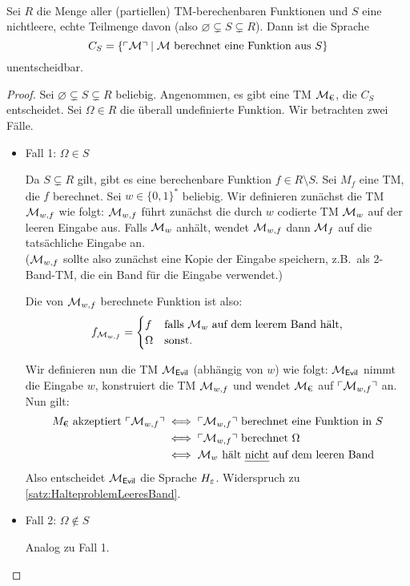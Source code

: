 \begin{Satz}\ \\
  Sei $R$ die Menge aller (partiellen) \ac{TM}-berechenbaren Funktionen und $S$
  eine nichtleere, echte Teilmenge davon (also $\varnothing \subsetneq S \subsetneq R$).
  Dann ist die Sprache
  $$C_S=\{\ulcorner \mathcal{M} \urcorner \mid \mathcal{M} \text{ berechnet eine Funktion aus }S\}$$
  unentscheidbar.
\end{Satz}
\begin{proof}
  Sei $\varnothing \subsetneq S \subsetneq R$ beliebig.
  Angenommen, es gibt eine \ac{TM} $\mathcal{M}_\text{€}$, die $C_S$ entscheidet.
  Sei $\Omega \in R$ die überall undefinierte Funktion. 
  Wir betrachten zwei Fälle.
  \begin{itemize}
   \item Fall 1: $\Omega \in S$
   
     Da $S\subsetneq R$ gilt, gibt es eine berechenbare Funktion $f \in R \setminus S$.
     Sei $M_f$ eine \ac{TM}, die $f$ berechnet.
     Sei $w\in\{0,1\}^*$ beliebig.
     Wir definieren zunächst die \ac{TM} $\mathcal{M}_{w, f}$ wie folgt:
     $\mathcal{M}_{w, f}$ führt zunächst die durch $w$ codierte \ac{TM} $\mathcal{M}_w$ auf der leeren Eingabe aus.
     Falls $\mathcal{M}_w$ anhält, wendet $\mathcal{M}_{w, f}$ dann $\mathcal{M}_f$ auf die tatsächliche Eingabe an.\\
     ($\mathcal{M}_{w, f}$ sollte also zunächst eine Kopie der Eingabe speichern,
     z.B.\ als 2-Band-\ac{TM}, die ein Band für die Eingabe verwendet.)
     
     Die von $\mathcal{M}_{w, f}$ berechnete Funktion ist also:
     $$f_{\mathcal{M}_{w, f}}=\begin{cases}
                      f & \text{falls } \mathcal{M}_w \text{ auf dem leerem Band hält,}\\
                      \Omega & \text{sonst.}
                      \end{cases}$$
     
     Wir definieren nun die \ac{TM} $\mathcal{M}_\textsf{Evil}$ (abhängig von $w$) wie folgt:
     $\mathcal{M}_\textsf{Evil}$ nimmt die Eingabe $w$, konstruiert die \ac{TM} $\mathcal{M}_{w, f}$ und wendet $\mathcal{M}_\text{€}$ auf $\ulcorner \mathcal{M}_{w, f} \urcorner$ an.
     Nun gilt:
     \begin{align*}
      M_\text{€} \text{ akzeptiert } \godel{\M_{w, f}}
      &\iff \godel{\M_{w, f}} \text{ berechnet eine Funktion in }S\\
      &\iff \godel{\M_{w, f}} \text{ berechnet }\Omega\\ %
      &\iff \M_w \text{ hält \emph{nicht} auf dem leeren Band}
    \end{align*}
    Also entscheidet $\mathcal{M}_\textsf{Evil}$ die Sprache $H_\varepsilon$. Widerspruch zu \autoref{satz:HalteproblemLeeresBand}.
    \item Fall 2: $\Omega \notin S$
    
    Analog zu Fall 1. \qedhere
  \end{itemize}
\end{proof}



